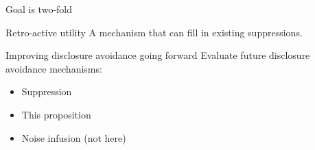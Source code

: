 %
%


\begin{frame}{Goal is two-fold}
\begin{block}{Retro-active utility}
A mechanism that can fill in existing suppressions.
\end{block}
\begin{block}{Improving disclosure avoidance going forward}
Evaluate future disclosure avoidance mechanisms:
\begin{itemize}
	\item Suppression
	\item This proposition
	\item Noise infusion (not here)
\end{itemize}
\end{block}
\end{frame}

